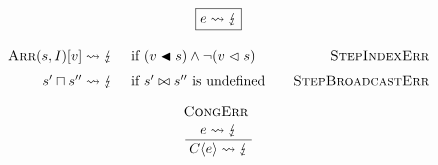 \renewcommand\arraystretch{1.5}
\begin{gather*}
\boxed{e \sterr} \\[0.5em]
\begin{array}{rlr}
\sarrayval{\vess}{I}[v] 
\leadsto \lightning 
&\text{ if } (v \inbstr \vess) \land \lnot (v \inbs \vess) 
& \textsc{StepIndexErr} \\
\vess' \broadcast \vess'' 
\leadsto \lightning 
&\text{ if } \vess' \broadcastsem \vess'' \text{ is undefined} 
&\quad \textsc{StepBroadcastErr}
\end{array}
\\
\irule{CongErr}{e \leadsto \lightning}{\evalct{C}{e} \leadsto \lightning}
\end{gather*}
